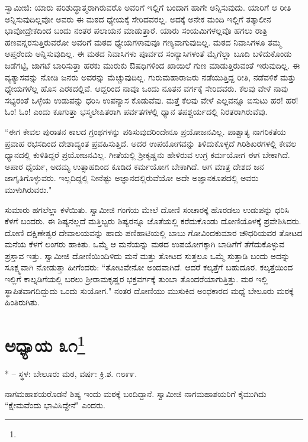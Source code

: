 ಸ್ವಾಮೀಜಿ: ಯಾರು ಪರಿಶುದ್ಧಾತ್ಮರಾಗಿರುವರೊ ಅವರಿಗೆ ಇಲ್ಲಿಗೆ ಬಂದಾಗ ಹಾಗೇ ಅನ್ನಿಸುವುದು. ಯಾರಿಗೆ ಆ ರೀತಿ ಅನ್ನಿಸುವುದಿಲ್ಲವೋ ಅವರು ಈ ಮಠದ ಧ್ಯೇಯಕ್ಕೆ ಸೇರಿದವರಲ್ಲ. ಅದಕ್ಕೆ ಅನೇಕ ಮಂದಿ ಇಲ್ಲಿಗೆ ತತ್ಕಾಲೀನ ಭಾವೋದ್ರೇಕದಿಂದ ಬಂದು ನಂತರ ಪಲಾಯನ ಮಾಡುತ್ತಾರೆ. ಯಾರು ಸಂಯಮಿಗಳಲ್ಲವೊ ಹಗಲು ರಾತ್ರಿ ಹಣವನ್ನರಸುತ್ತಿರುವರೋ ಅವರಿಗೆ ಮಠದ ಧ್ಯೇಯಗಳಾವುವೂ ಗಣ್ಯವಾಗುವುದಿಲ್ಲ. ಮಠದ ನಿವಾಸಿಗಳೂ ತಮ್ಮ ಆಪ್ತರೆಂದು ಅನ್ನಿಸುವುದಿಲ್ಲ. ಈ ಮಠದ ನಿವಾಸಿಗಳು ಪೂರ್ವದ ಸಂನ್ಯಾಸಿಗಳಂತೆ ಮೈಗೆಲ್ಲಾ ಬೂದಿ ಬಳಿದುಕೊಂಡು ಜಡೆಗಟ್ಟಿ, ಜಾಗಟೆ ಬಾರಿಸುತ್ತಾ ಹರಕು ಮುರುಕು ಔಷಧಿಗಳಿಂದ ಖಾಯಿಲೆ ಗುಣ ಮಾಡುತ್ತಿರುವಂತೆ ಇರುವುದಿಲ್ಲ. ಈ ವ್ಯತ್ಯಾಸವನ್ನು ನೋಡಿ ಜನರು ಅವರನ್ನು ಮೆಚ್ಚುವುದಿಲ್ಲ. ಗುರುಮಹಾರಾಜರು ನಡೆಯುತ್ತಿದ್ದ ರೀತಿ, ನಡೆವಳಿಕೆ ಮತ್ತು ಧ್ಯೇಯಗಳೆಲ್ಲ ಹೊಸ ಎರಕದಲ್ಲಿವೆ. ಆದ್ದರಿಂದ ನಾವೂ ಒಂದು ನೂತನ ವರ್ಗಕ್ಕೆ ಸೇರಿದವರು. ಕೆಲವು ವೇಳೆ ನಾವು ಸಭ್ಯರಂತೆ ಒಳ್ಳೆಯ ಉಡುಪನ್ನು ಧರಿಸಿ ಉಪನ್ಯಾಸ ಕೊಡುವೆವು. ಮತ್ತೆ ಕೆಲವು ವೇಳೆ ಎಲ್ಲವನ್ನೂ ಬಿಸುಟು ಹರ! ಹರ! ಓಂ! ಓಂ! ಎಂದು ಕೂಗುತ್ತಾ ಭಸ್ಮಲೇಪಿತರಾಗಿ ಪರ್ವತಗಳಲ್ಲಿ ಧ್ಯಾನ ತಪಶ್ಚರ್ಯದಲ್ಲಿ ನಿರತರಾಗಿರುವೆವು.

“ಈಗ ಕೇವಲ ಪುರಾತನ ಕಾಲದ ಗ್ರಂಥಗಳನ್ನು ಪಠಿಸುವುದರಿಂದೇನೂ ಪ್ರಯೋಜನವಿಲ್ಲ. ಪಾಶ್ಚಾತ್ಯ ನಾಗರಿಕತೆಯ ಪ್ರವಾಹ ರಭಸದಿಂದ ದೇಶಾದ್ಯಂತ ಪ್ರವಹಿಸುತ್ತಿದೆ. ಅದರ ಉಪಯೋಗವನ್ನು ತಿಳಿದುಕೊಳ್ಳದೆ ಗಿರಿಶಿಖರಗಳಲ್ಲಿ ಕೇವಲ ಧ್ಯಾನದಲ್ಲಿ ಕುಳಿತಿದ್ದರೆ ಪ್ರಯೋಜನವಿಲ್ಲ. ಗೀತೆಯಲ್ಲಿ ಶ‍್ರೀಕೃಷ್ಣನು ಹೇಳಿರುವ ಉಗ್ರ ಕರ್ಮಯೋಗ ಈಗ ಬೇಕಾಗಿದೆ. ಅಪಾರ ಧೈರ್ಯ, ಅದಮ್ಯ ಉತ್ಸಾಹದಿಂದ ಕೂಡಿದ ಕರ್ಮಯೋಗ ಬೇಕಾಗಿದೆ. ಆಗ ಮಾತ್ರ ದೇಶದ ಜನ ಜಾಗೃತಿಗೊಳ್ಳುವರು. ಇಲ್ಲದಿದ್ದಲ್ಲಿ ನೀನೆಷ್ಟು ಅಜ್ಞಾನದಲ್ಲಿರುವೆಯೋ ಅದೇ ಅಜ್ಞಾನಕೂಪದಲ್ಲಿ ಅವರು ಮುಳುಗಿರುವರು."

ಸುಮಾರು ಹಗಲೆಲ್ಲಾ ಕಳೆಯಿತು. ಸ್ವಾಮೀಜಿ ಗಂಗೆಯ ಮೇಲೆ ದೋಣಿ ಸಂಚಾರಕ್ಕೆ ಹೊರಡಲು ಉಡುಪನ್ನು ಧರಿಸಿ ಕೆಳಗೆ ಬಂದರು. ಈ ಶಿಷ್ಯನಲ್ಲದೆ ಮತ್ತಿಬ್ಬರು ಶಿಷ್ಯರನ್ನೂ ಜೊತೆಯಲ್ಲಿ ಕರೆದುಕೊಂಡು ದೋಣಿಯೊಳಕ್ಕೆ ಪ್ರವೇಶಿಸಿದರು. ದೋಣಿ ದಕ್ಷಿಣೇಶ್ವರ ದೇವಾಲಯವನ್ನು ಹಾದು ಪಣಿಹಾಟಿಯಲ್ಲಿ ಬಾಬು ಗೋವಿಂದಕುಮಾರ ಚೌಧರಿಯವರ ತೋಟದ ಮನೆಯ ಕೆಳಗೆ ಲಂಗರು ಹಾಕಿತು. ಒಮ್ಮೆ ಆ ಮನೆಯನ್ನು ಮಠದ ಉಪಯೋಗಕ್ಕಾಗಿ ಬಾಡಿಗೆಗೆ ತೆಗೆದುಕೊಳ್ಳುವ ಪ್ರಸ್ತಾವ ಇತ್ತು. ಸ್ವಾಮೀಜಿ ದೋಣಿಯಿಂದಿಳಿದು ಮನೆ ಮತ್ತು ತೋಟದ ಸುತ್ತಲೂ ಒಮ್ಮೆ ಸುತ್ತಾಡಿ ಬಂದು ಅದನ್ನು ಸೂಕ್ಷ್ಮವಾಗಿ ನೋಡುತ್ತಾ ಹೀಗೆಂದರು: “ತೋಟವೇನೋ ಅಂದವಾಗಿದೆ. ಆದರೆ ಕಲ್ಕತ್ತೆಗೆ ಬಹುದೂರ. ಕಲ್ಕತ್ತೆಯಿಂದ ಇಲ್ಲಿಗೆ ಕಾಲ್ನಡಿಗೆಯಲ್ಲಿ ಬರಲು ಶ‍್ರೀರಾಮಕೃಷ್ಣರ ಭಕ್ತವರ್ಗಕ್ಕೆ ತುಂಬಾ ತೊಂದರೆಯಾಗುತ್ತಿತ್ತು. ಮಠ ಇಲ್ಲಿ ಸ್ಥಾಪಿತವಾಗದಿದ್ದುದು ಒಂದು ಸುಯೋಗ." ನಂತರ ದೋಣಿಯು ಮುಸುಕಿದ ಅಂಧಕಾರದ ಮಧ್ಯೆ ಬೇಲೂರು ಮಠಕ್ಕೆ ಹಿಂತಿರುಗಿತು.

\newpage

\chapter[ಅಧ್ಯಾಯ ೩೧]{ಅಧ್ಯಾಯ ೩೧\protect\footnote{}}

\centerline{* – ಸ್ಥಳ: ಬೇಲೂರು ಮಠ, ವರ್ಷ: ಕ್ರಿ.ಶ. ೧೮೯೯.}

ನಾಗಮಹಾಶಯರೊಡನೆ ಶಿಷ್ಯ ಇಂದು ಮಠಕ್ಕೆ ಬಂದಿದ್ದಾನೆ. ಸ್ವಾಮೀಜಿ ನಾಗಮಹಾಶಯರಿಗೆ ಕೈಮುಗಿದು “ಕ್ಷೇಮವೆಂದು ಭಾವಿಸಿದ್ದೇನೆ" ಎಂದರು.

